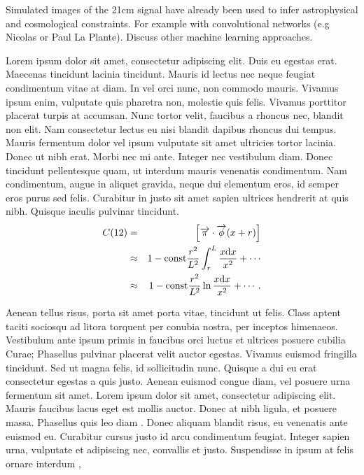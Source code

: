 Simulated images of the 21cm signal have already been used to infer astrophysical and cosmological constraints. For example with convolutional networks (e.g Nicolas or Paul La Plante). Discuss other machine learning approaches.



\iffalse

Lorem ipsum dolor sit amet, consectetur adipiscing elit. Duis eu egestas erat. Maecenas tincidunt lacinia tincidunt. Mauris id lectus nec neque feugiat condimentum vitae at diam. In vel orci nunc, non commodo mauris. Vivamus ipsum enim, vulputate quis pharetra non, molestie quis felis. Vivamus porttitor placerat turpis at accumsan. Nunc tortor velit, faucibus a rhoncus nec, blandit non elit. Nam consectetur lectus eu nisi blandit dapibus rhoncus dui tempus. Mauris fermentum dolor vel ipsum vulputate sit amet ultricies tortor lacinia. Donec ut nibh erat. Morbi nec mi ante. Integer nec vestibulum diam. Donec tincidunt pellentesque quam, ut interdum mauris venenatis condimentum. Nam condimentum, augue in aliquet gravida, neque dui elementum eros, id semper eros purus sed felis. Curabitur in justo sit amet sapien ultrices hendrerit at quis nibh. Quisque iaculis pulvinar tincidunt. 
\begin{eqnarray}
C(12) &= &\left[\overrightarrow{\pi}\cdot\overrightarrow{\phi}(x+r)\right] \nonumber \\ 
&\approx& 1-\mathrm{const}\frac{r^2}{L^2}\int_r^L\frac{x\mathrm{d} x}{x^2} + \cdots \nonumber  \\
&\approx& 1-\mathrm{const}\frac{r^2}{L^2}\ln\frac{x\mathrm{d} x}{x^2} + \cdots .\label{brokenlongeqn}
\end{eqnarray}

Aenean tellus risus, porta sit amet porta vitae, tincidunt ut felis. Class aptent taciti sociosqu ad litora torquent per conubia nostra, per inceptos himenaeos. Vestibulum ante ipsum primis in faucibus orci luctus et ultrices posuere cubilia Curae; Phasellus pulvinar placerat velit auctor egestas. Vivamus euismod fringilla tincidunt. Sed ut magna felis, id sollicitudin nunc. Quisque a dui eu erat consectetur egestas a quis justo. Aenean euismod congue diam, vel posuere urna fermentum sit amet. Lorem ipsum dolor sit amet, consectetur adipiscing elit. Mauris faucibus lacus eget est mollis auctor. Donec at nibh ligula, et posuere massa. Phasellus quis leo diam \cite{diamantaras1996pcn}.
Donec aliquam blandit risus, eu venenatis ante euismod eu. Curabitur cursus justo id arcu condimentum feugiat. Integer sapien urna, vulputate et adipiscing nec, convallis et justo. Suspendisse in ipsum at felis ornare interdum \cite{tulone2006pts},

